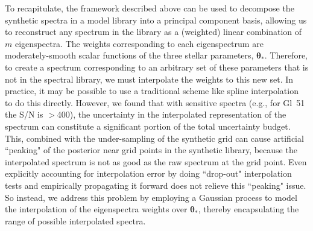 \documentclass[iop,floatfix,numberedappendix,twocolappendix]{emulateapj}
\newcommand{\vt}{ {\bm \theta}}
\begin{document}
To recapitulate, the framework described above can be used to decompose the synthetic spectra in a 
model library into a principal component basis, allowing us to reconstruct any spectrum in 
the library as a (weighted) linear combination of $m$ eigenspectra.  The weights corresponding to 
each eigenspectrum are moderately-smooth scalar functions of the three stellar parameters, 
$\vt_{\ast}$.  Therefore, to create a spectrum corresponding to an arbitrary set of these 
parameters that is not in the spectral library, we must interpolate the weights to this new set.  
In practice, it may be possible to use a traditional scheme like spline interpolation to do this 
directly.  However, we found that with sensitive spectra (e.g., for Gl~51 the S/N is $>$400), the 
uncertainty in the interpolated representation of the spectrum can constitute a significant portion 
of the total uncertainty budget.  This, combined with the under-sampling of the synthetic grid can 
cause artificial ``peaking" of the posterior near grid points in the synthetic library, because the 
interpolated spectrum is not as good as the raw spectrum at the grid point.  Even explicitly 
accounting for interpolation error by doing ``drop-out" interpolation tests and empirically 
propagating it forward does not relieve this ``peaking" issue.  So instead, we address this problem 
by employing a Gaussian process to model the interpolation of the eigenspectra weights over 
$\vt_{\ast}$, thereby encapsulating the range of possible interpolated spectra. 
\end{document}
